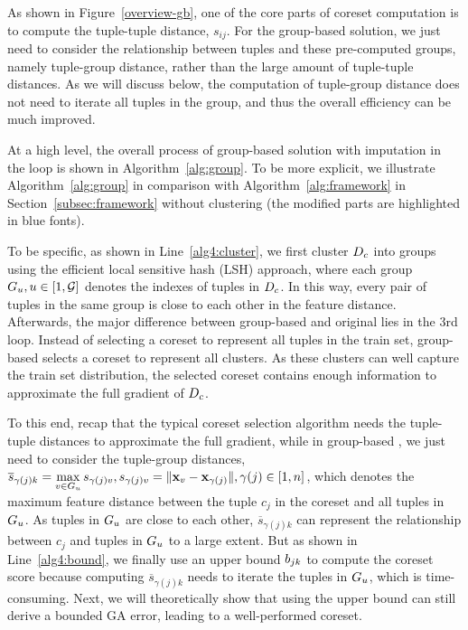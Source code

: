 As shown in Figure~\ref{overview-gb}, one of the core parts of coreset computation is to compute the tuple-tuple distance, \ie $s_{ij}$. For the group-based solution, we just need to consider the relationship between tuples and these pre-computed groups, namely tuple-group distance, rather than the large amount of tuple-tuple distances. As we will discuss below, the computation of tuple-group distance does not need to iterate all tuples in the group, and thus  the overall efficiency can be much improved. 

At a high level, the overall process of group-based \ours solution with imputation in the loop is shown in Algorithm~\ref{alg:group}. To be more explicit, we illustrate Algorithm~\ref{alg:group} in comparison with Algorithm~\ref{alg:framework} in Section~\ref{subsec:framework} without clustering (the modified parts are highlighted in blue fonts).

To be specific, as shown in Line~\ref{alg4:cluster}, we first cluster $D_c$ into groups using the efficient local sensitive hash (LSH) approach, where each group $G_u, u\in[1, \mathcal{G}]$ denotes the indexes of tuples in $D_c$. In this way, every pair of tuples in the same group is close to each other in the feature distance.
%
 Afterwards, the major difference between group-based \ours and original \ours lies in the 3rd loop. Instead of  selecting a coreset to represent all tuples in the train set, group-based \ours selects a coreset to represent all clusters. As these clusters can well capture the train set distribution, the selected coreset contains enough information to approximate the full gradient of $D_c$. 
 
 To this end, recap that the typical coreset selection algorithm needs the tuple-tuple distances to approximate the full gradient, while in group-based \ours, we just need to consider the tuple-group distances, \ie  
$\overline{s}_{\gamma(j)k} = \max\limits_{v \in G_u} s_{\gamma(j)v}, s_{\gamma(j)v} = \lVert\mathbf{x}_v - \mathbf{x}_{\gamma(j)}\rVert, \gamma(j)\in[1, n]$, which denotes the maximum feature distance between the tuple $c_j$ in the coreset and all tuples in $G_u$. As tuples in $G_u$ are close to each other, $\overline{s}_{\gamma(j)k}$ can represent the relationship between $c_j$ and tuples in $G_u$ to a large extent. But as shown in Line~\ref{alg4:bound}, we finally use an upper bound $b_{jk}$ to compute the coreset score because computing $\overline{s}_{\gamma(j)k}$ needs to iterate the tuples in $G_u$, which is time-consuming. Next, we will theoretically show that using the upper bound can still derive a bounded GA error, leading to a well-performed coreset. 

